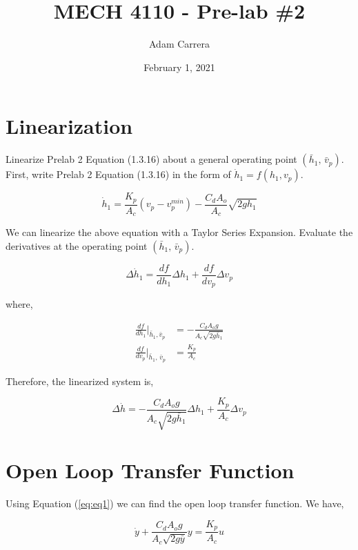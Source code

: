 \documentclass[12pt]{article}
\author{Adam Carrera}
\date{February 1, 2021}
\title{MECH 4110 - Pre-lab \#2}
\numberwithin{equation}{section}
\newcommand\eval{\bigg\rvert}
\begin{document}
  \maketitle

  \section{Linearization}

  Linearize Prelab 2 Equation (1.3.16) about a general operating point $ (\bar h_1, \, \bar v_p). $ First, write Prelab 2 Equation (1.3.16) in the form of $ \dot h_1 = f(h_1, v_p). $

  \begin{equation}
    \dot h_1 = \frac{K_p}{A_c} (v_p - v_p^{min}) - \frac{C_d A_o}{A_c}\sqrt{2gh_1}
  \end{equation}

  We can linearize the above equation with a Taylor Series Expansion. Evaluate the derivatives at the operating point $ (\bar h_1, \, \bar v_p). $

  \begin{equation}
    \Delta \dot h_1 = \frac{df}{dh_1} \Delta h_1 + \frac{df}{dv_p} \Delta v_p
  \end{equation}

  where,

  \begin{align}
    \frac{df}{dh_1}\eval_{\bar h_1, \bar v_p} &= -\frac{C_d A_o g}{A_c\sqrt{2g\bar h_1}} \\
    \frac{df}{dv_p}\eval_{\bar h_1, \, \bar v_p} &= \frac{K_p}{A_c}
  \end{align}

  Therefore, the linearized system is,

  \begin{equation}\label{eq:eq1}
    \Delta \dot h = -\frac{C_d A_o g}{A_c\sqrt{2g\bar h_1}} \Delta h_1 + \frac{K_p}{A_c} \Delta v_p
  \end{equation}

  \newpage

  \section{Open Loop Transfer Function}

  Using Equation (\ref{eq:eq1}) we can find the open loop transfer function. We have,

  \begin{equation}
    \dot y + \frac{C_d A_o g}{A_c\sqrt{2g\bar y}} y = \frac{K_p}{A_c} u
  \end{equation}
\end{document}
